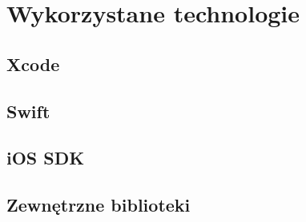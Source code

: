 \chapter{Wykorzystane technologie}

\section{Xcode}

\section{Swift}

\section{iOS SDK}

\section{Zewnętrzne biblioteki}

